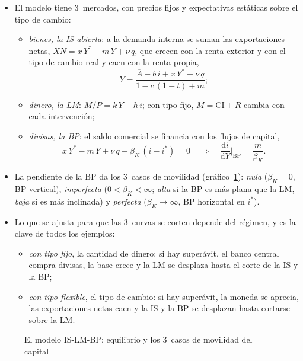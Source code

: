 \documentclass[11pt]{article}
\begin{document}
\begin{itemize}
\item El modelo tiene 3~mercados, con precios fijos y expectativas estáticas sobre el tipo de cambio:
  \begin{itemize}
  \item \emph{bienes, la IS abierta}: a la demanda interna se suman las exportaciones netas, $XN=x\,Y^*-m\,Y+\nu\,q$, que crecen con la renta exterior y con el tipo de cambio real y caen con la renta propia,
    \begin{equation}\label{eq:anexo-is}
    Y=\frac{\overline{A}-b\,i+x\,Y^*+\nu\,q}{1-c\,(1-t)+m};
    \end{equation}
  \item \emph{dinero, la LM}: $M/P=k\,Y-h\,i$; con tipo fijo, $M=\mathrm{CI}+R$ cambia con cada intervención;
  \item \emph{divisas, la BP}: el saldo comercial se financia con los flujos de capital,
    \begin{equation}\label{eq:anexo-bp}
    x\,Y^*-m\,Y+\nu\,q+\beta_K\,(i-i^*)=0\quad\Rightarrow\quad\frac{\mathrm{d}i}{\mathrm{d}Y}\bigg|_{\mathrm{BP}}=\frac{m}{\beta_K}.
    \end{equation}
  \end{itemize}
\item La pendiente de la BP da los 3~casos de movilidad (gráfico~\ref{fig:anexo-is-lm-bp}): \emph{nula} ($\beta_K=0$, BP vertical), \emph{imperfecta} ($0<\beta_K<\infty$; \emph{alta} si la BP es más plana que la LM, \emph{baja} si es más inclinada) y \emph{perfecta} ($\beta_K\to\infty$, BP horizontal en $i^*$).
\item Lo que se ajusta para que las 3~curvas se corten depende del régimen, y es la clave de todos los ejemplos:
  \begin{itemize}
  \item \emph{con tipo fijo}, la cantidad de dinero: si hay superávit, el banco central compra divisas, la base crece y la LM se desplaza hasta el corte de la IS y la BP;
  \item \emph{con tipo flexible}, el tipo de cambio: si hay superávit, la moneda se aprecia, las exportaciones netas caen y la IS y la BP se desplazan hasta cortarse sobre la LM.
  \end{itemize}
\end{itemize}

\begin{figure}[H]
\centering
\caption{El modelo IS-LM-BP: equilibrio y los 3~casos de movilidad del capital}\label{fig:anexo-is-lm-bp}
\end{figure}
\end{document}
